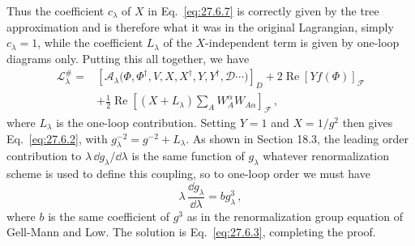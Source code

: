 Thus the coefficient \(c_\lambda\) of \(X\) in Eq.~\eqref{eq:27.6.7} is
correctly given by the tree approximation and is therefore what it was in
the original Lagrangian, simply \(c_\lambda=1\), while the coefficient
\(L_\lambda\) of the \(X\)-independent term is given by one-loop diagrams
only. Putting this all together, we have
\begin{equation}
  \begin{aligned}
  \mathcal{L}^{\#}_\lambda
  ={}&
  \left[
    \mathcal{A}_\lambda
    \bigl(\Phi,\Phi^\dagger,V,X,X^\dagger,Y,Y^\dagger,
    \mathcal{D}\cdots\bigr)
  \right]_D
  +2\operatorname{Re}\left[Yf(\Phi)\right]_{\mathcal{F}}
  \\
  &+\frac12\operatorname{Re}
  \left[
    (X+L_\lambda)
    \sum_A W_A^\alpha W_{A\alpha}
  \right]_{\mathcal{F}}\,,
  \end{aligned}
  \tag{27.6.13}\label{eq:27.6.13}
\end{equation}
where \(L_\lambda\) is the one-loop contribution. Setting \(Y=1\) and
\(X=1/g^2\) then gives Eq.~\eqref{eq:27.6.2}, with
\(g_\lambda^{-2}=g^{-2}+L_\lambda\). As shown in Section 18.3, the leading
order contribution to \(\lambda\,\dd g_\lambda/\dd\lambda\) is the same function
of \(g_\lambda\) whatever renormalization scheme is used to define this
coupling, so to one-loop order we must have
\begin{equation}
  \lambda\,\frac{\dd g_\lambda}{\dd\lambda}=bg_\lambda^3\,,
  \tag{27.6.14}\label{eq:27.6.14}
\end{equation}
where \(b\) is the same coefficient of \(g^3\) as in the renormalization
group equation of Gell-Mann and Low. The solution is
Eq.~\eqref{eq:27.6.3}, completing the proof.

